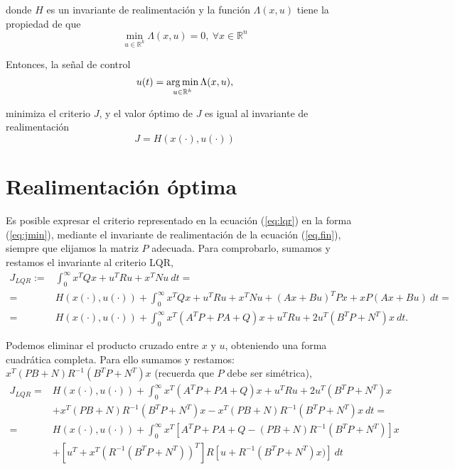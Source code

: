 donde $H$ es un invariante de realimentación y la función $\Lambda(x,u)$ tiene la propiedad de que
\begin{equation*}
\min_{u \in \mathbb{R}^k} \Lambda(x,u) = 0,\ \forall x \in \mathbb{R}^n
\end{equation*}

Entonces, la señal de control
\begin{equation*}
u(t) = \argmin_{u \in \mathbb{R}^k} \Lambda (x,u),
\end{equation*}

minimiza el criterio $J$, y el valor óptimo de $J$ es igual al invariante de realimentación
\begin{equation*}
J = H\left(x(\cdot),u(\cdot)\right)
\end{equation*}

\section{Realimentación óptima}

Es posible expresar el criterio representado en la ecuación (\ref{eq:lqr}) en la forma (\ref{eq:jmin}), mediante el invariante de realimentación de la ecuación (\ref{eq.fin}), siempre que elijamos la matriz $P$ adecuada. Para comprobarlo, sumamos y restamos el invariante al criterio LQR,
 \begin{equation*}
 \begin{split}
J_{LQR} :=& \int_0^{\infty}x^TQx+u^TRu+x^TNu\  dt =\\
=& H\left(x(\cdot),u(\cdot)\right) + \int_0^{\infty}x^TQx+u^TRu+x^TNu+\left(Ax+Bu\right)^TPx+xP\left(Ax+Bu\right) \  dt=\\ 
=& H\left(x(\cdot),u(\cdot)\right) + \int_0^{\infty}x^T(A^TP+PA+Q)x+u^TRu+2u^T(B^TP+N^T)x\ dt.
\end{split}
\end{equation*}

Podemos eliminar el producto cruzado entre $x$ y $u$, obteniendo una forma cuadrática completa. Para ello sumamos  y restamos: $x^T(PB+N)R^{-1}(B^TP+N^T)x$ (recuerda que $P$ debe ser simétrica),
\begin{equation*}
\begin{split}
J_{LQR} =&H\left(x(\cdot),u(\cdot)\right) + \int_0^{\infty}x^T(A^TP+PA+Q)x+u^TRu+2u^T(B^TP+N^T)x\\
&+ x^T(PB+N)R^{-1}(B^TP+N^T)x-x^T(PB+N)R^{-1}(B^TP+N^T)x \ dt =\\
=&H\left(x(\cdot),u(\cdot)\right) + \int_0^{\infty}x^T\left[A^TP+PA+Q-(PB+N)R^{-1}(B^TP+N^T)\right]x\\
&+\left[u^T+x^T\left(R^{-1}(B^TP+N^T)\right)^T\right]R\left[u+R^{-1}(B^TP+N^T)x)\right]\ dt
\end{split}
\end{equation*}

